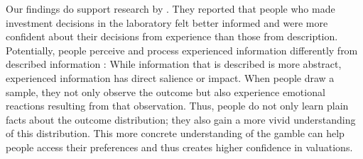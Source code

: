 \documentclass[a4paper, man, natbib, floatsintext]{apa6}
\begin{document}
Our findings do support research by \cite{Bradbury2014}. They reported that people who made investment decisions in the laboratory felt better informed and were more confident about their decisions from experience than those from description.
Potentially, people perceive and process experienced information differently from described information \citep{Kahneman2009}: 
While information that is described is more abstract, experienced information has direct salience or impact. When people draw a sample, they not only observe the outcome but also experience emotional reactions resulting from that observation. Thus, people do not only learn plain facts about the outcome distribution; they also gain a more vivid understanding of this distribution. This more concrete understanding of the gamble can help people access their preferences and thus creates higher confidence in valuations.









\end{document}

